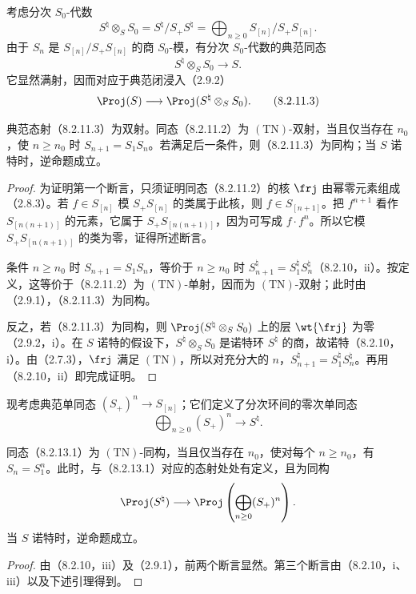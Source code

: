考虑分次 $S_0$-代数
\begin{equation}
S^{\natural}\otimes_S S_0=S^{\natural}/S_+S^{\natural}
=\bigoplus_{n\geq0}S_{[n]}/S_+S_{[n]}.
\tag{8.2.11.1}
\end{equation}
由于 $S_n$ 是 $S_{[n]}/S_+S_{[n]}$ 的商 $S_0$-模，有分次 $S_0$-代数的典范同态
\begin{equation}
S^{\natural}\otimes_S S_0\longrightarrow S.
\tag{8.2.11.2}
\end{equation}
它显然满射，因而对应于典范闭浸入（2.9.2）
\begin{equation}
\Proj(S)\longrightarrow\Proj(S^{\natural}\otimes_S S_0).
\tag{8.2.11.3}
\end{equation}

典范态射（8.2.11.3）为双射。同态（8.2.11.2）为 $(\mathrm{TN})$-双射，当且仅当存在 $n_0$，使 $n\geq n_0$ 时 $S_{n+1}=S_1S_n$。若满足后一条件，则（8.2.11.3）为同构；当 $S$ 诺特时，逆命题成立。
\begin{proof}
为证明第一个断言，只须证明同态（8.2.11.2）的核 $\frj$ 由幂零元素组成（2.8.3）。若 $f\in S_{[n]}$ 模 $S_+S_{[n]}$ 的类属于此核，则 $f\in S_{[n+1]}$。把 $f^{n+1}$ 看作 $S_{[n(n+1)]}$ 的元素，它属于 $S_+S_{[n(n+1)]}$，因为可写成 $f\cdot f^n$。所以它模 $S_+S_{[n(n+1)]}$ 的类为零，证得所述断言。

条件 $n\geq n_0$ 时 $S_{n+1}=S_1S_n$，等价于 $n\geq n_0$ 时 $S_{n+1}^{\natural}=S_1^{\natural}S_n^{\natural}$（8.2.10，ii）。按定义，这等价于（8.2.11.2）为 $(\mathrm{TN})$-单射，因而为 $(\mathrm{TN})$-双射；此时由（2.9.1），（8.2.11.3）为同构。

反之，若（8.2.11.3）为同构，则 $\Proj(S^{\natural}\otimes_S S_0)$ 上的层 $\wt{\frj}$ 为零（2.9.2，i）。在 $S$ 诺特的假设下，$S^{\natural}\otimes_S S_0$ 是诺特环 $S^{\natural}$ 的商，故诺特（8.2.10，i）。由（2.7.3），$\frj$ 满足 $(\mathrm{TN})$，所以对充分大的 $n$，$S_{n+1}^{\natural}=S_1^{\natural}S_n^{\natural}$。再用（8.2.10，ii）即完成证明。
\end{proof}

现考虑典范单同态 $(S_+)^n\to S_{[n]}$；它们定义了分次环间的零次单同态
\begin{equation}
\bigoplus_{n\geq0}(S_+)^n\longrightarrow S^{\natural}.
\tag{8.2.13.1}
\end{equation}

同态（8.2.13.1）为 $(\mathrm{TN})$-同构，当且仅当存在 $n_0$，使对每个 $n\geq n_0$，有 $S_n=S_1^n$。此时，与（8.2.13.1）对应的态射处处有定义，且为同构
\[
\Proj(S^{\natural})\longrightarrow\Proj\left(\bigoplus_{n\geq0}(S_+)^n\right).
\]
当 $S$ 诺特时，逆命题成立。
\begin{proof}
由（8.2.10，iii）及（2.9.1），前两个断言显然。第三个断言由（8.2.10，i、iii）以及下述引理得到。
\end{proof}

